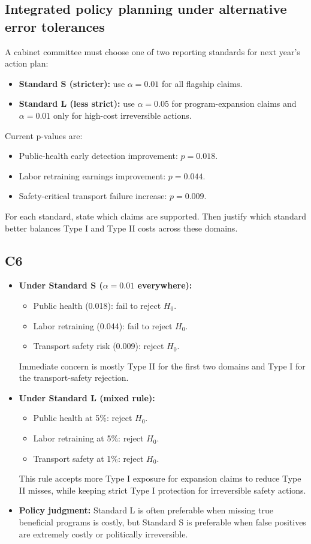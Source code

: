 \begin{ExamProblems}
\section{Integrated policy planning under alternative error tolerances}
A cabinet committee must choose one of two reporting standards for next year's action plan:
\begin{itemize}
    \item \textbf{Standard S (stricter):} use \(\alpha=0.01\) for all flagship claims.
    \item \textbf{Standard L (less strict):} use \(\alpha=0.05\) for program-expansion claims and \(\alpha=0.01\) only for high-cost irreversible actions.
\end{itemize}
Current p-values are:
\begin{itemize}
    \item Public-health early detection improvement: \(p=0.018\).
    \item Labor retraining earnings improvement: \(p=0.044\).
    \item Safety-critical transport failure increase: \(p=0.009\).
\end{itemize}
For each standard, state which claims are supported. Then justify which standard better balances Type I and Type II costs across these domains.

\subsection*{C6}
\begin{itemize}
    \item \textbf{Under Standard S (\(\alpha=0.01\) everywhere):}
    \begin{itemize}
        \item Public health (0.018): fail to reject \(H_0\).
        \item Labor retraining (0.044): fail to reject \(H_0\).
        \item Transport safety risk (0.009): reject \(H_0\).
    \end{itemize}
    Immediate concern is mostly Type II for the first two domains and Type I for the transport-safety rejection.
    \item \textbf{Under Standard L (mixed rule):}
    \begin{itemize}
        \item Public health at 5\%: reject \(H_0\).
        \item Labor retraining at 5\%: reject \(H_0\).
        \item Transport safety at 1\%: reject \(H_0\).
    \end{itemize}
    This rule accepts more Type I exposure for expansion claims to reduce Type II misses, while keeping strict Type I protection for irreversible safety actions.
    \item \textbf{Policy judgment:} Standard L is often preferable when missing true beneficial programs is costly, but Standard S is preferable when false positives are extremely costly or politically irreversible.
\end{itemize}

\end{ExamProblems}

